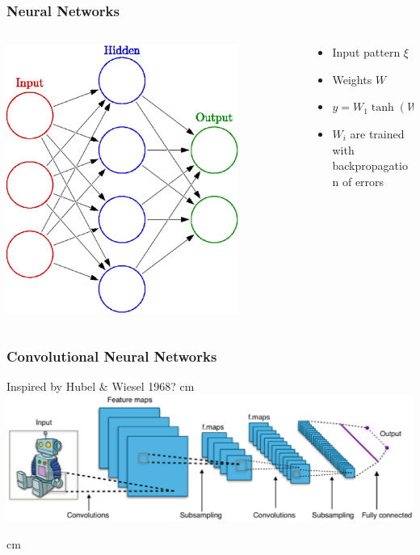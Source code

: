 \documentclass{beamer}
\begin{document}
\begin{frame}
  \frametitle{Neural Networks}
  \begin{columns}
    \begin{column}{0.5\textwidth}
      \includegraphics[width=0.8\textwidth]{neural_network}
    \end{column}
    \begin{column}{0.5\textwidth}
      \begin{itemize}
      \item Input pattern $\xi$
      \item Weights $W$
      \item $y = W_1 \tanh (W_0 \xi) $
      \item $W_i$ are trained with backpropagation of errors
      \end{itemize}
    \end{column}
  \end{columns}
\end{frame}

\begin{frame}
  \frametitle{Convolutional Neural Networks}
  Inspired by Hubel \& Wiesel 1968?
   cm
  \includegraphics[width=\textwidth]{ConvolutionalNet}

   cm
  \begin{center}
    \href{http://yann.lecun.com/exdb/lenet/}{}
  \end{center}
\end{frame}
\end{document}
